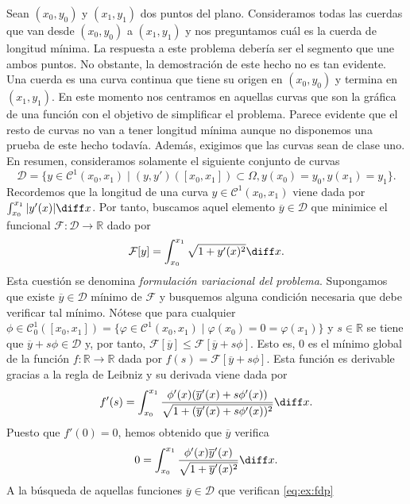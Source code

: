 \documentclass{article}
\begin{document}
\begin{ex} \label{ex:intro} Sean $(x_0, y_0)$ y $(x_1, y_1)$ dos
  puntos del plano. Consideramos todas las cuerdas que van desde $(x_0, y_0)$ a $(x_1, y_1)$ y nos
  preguntamos cuál es la cuerda de longitud mínima. La respuesta a este problema debería ser el
  segmento que une ambos puntos. No obstante, la demostración de este hecho no es tan evidente. Una
  cuerda es una curva continua que tiene su origen en $(x_0, y_0)$ y termina en $(x_1, y_1)$. En
  este momento nos centramos en aquellas curvas que son la gráfica de una función con el objetivo de
  simplificar el problema. Parece evidente que el resto de curvas no van a tener longitud mínima
  aunque no disponemos una prueba de este hecho todavía. Además, exigimos que las curvas sean de
  clase uno. En resumen, consideramos solamente el siguiente conjunto de curvas
  \[\mathcal{D} = \{y \in \mathcal{C}^1(x_0, x_1)\mid (y, y')([x_0, x_1]) \subset \Omega, y(x_0) =
    y_0, y(x_1) = y_1\}.\] Recordemos que la longitud de una curva $y \in \mathcal{C}^1(x_0, x_1)$
  viene dada por $\int_{x_0}^{x_1} |y'(x)| \diff x$. Por tanto, buscamos aquel elemento
  $\overline{y} \in \mathcal{D}$ que minimice el funcional
  $\mathcal{F}\colon \mathcal{D} \to \mathbb{R}$ dado por
  \[\mathcal{F}[y] = \int_{x_0}^{x_1} \sqrt{1 + y'(x)^2} \diff x.\]
  Esta cuestión se denomina \emph{formulación variacional del problema}. Supongamos que existe
  $\overline{y} \in \mathcal{D}$ mínimo de $\mathcal{F}$ y busquemos alguna condición necesaria que
  debe verificar tal mínimo. Nótese que para cualquier
  $\phi \in \mathcal{C}^1_0([x_0, x_1]) = \{\varphi \in \mathcal{C}^1(x_0, x_1)\mid \varphi(x_0) = 0
  = \varphi(x_1)\}$ y $s \in \mathbb{R}$ se tiene que $\overline{y} + s \phi \in \mathcal{D}$ y, por
  tanto, $\mathcal{F}[\overline{y}] \le \mathcal{F}[\overline{y} + s \phi]$. Esto es, $0$ es el
  mínimo global de la función $f\colon \mathbb{R} \to \mathbb{R}$ dada por
  $f(s) = \mathcal{F}[\overline{y} + s \phi]$. Esta función es derivable gracias a la regla de
  Leibniz y su derivada viene dada por
  \[f'(s) = \int_{x_0}^{x_1} \frac{\phi'(x)(\overline{y}'(x) + s \phi'(x))}{\sqrt{1 +
        (\overline{y}'(x) + s \phi'(x))^2}} \diff x.\] Puesto que $f'(0) = 0$, hemos obtenido que
  $\overline{y}$ verifica
  \begin{equation} \label{eq:ex:fdp} 0 = \int_{x_0}^{x_1} \frac{\phi'(x) \overline{y}'(x)}{\sqrt{1 +
        \overline{y}'(x)^2}} \diff x.
  \end{equation}
  A la búsqueda de aquellas funciones $\overline{y} \in \mathcal{D}$ que verifican \eqref{eq:ex:fdp}

\end{ex}
\end{document}
